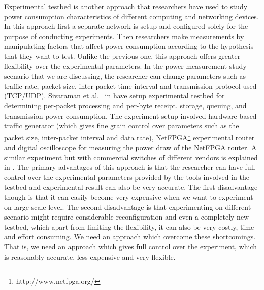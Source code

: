 Experimental testbed is another approach that researchers have used to study power consumption characteristics of different computing and networking devices. In this approach first a separate network is setup and configured solely for the purpose of conducting experiments. Then researchers make measurements by manipulating factors that affect power consumption according to the hypothesis that they want to test. Unlike the previous one, this approach offers greater flexibility over the experimental parameters. In the power measurement study scenario that we are discussing, the researcher can change parameters such as traffic rate, packet size, inter-packet time interval and transmission protocol used (TCP/UDP). Sivaraman et al.{\ } in \cite{Sivaraman} have setup experimental testbed for determining per-packet processing and per-byte receipt, storage, queuing, and transmission power consumption. The experiment setup involved hardware-based traffic generator (which gives fine grain control over parameters such as the packet size, inter-packet interval and data rate), NetFPGA\footnote{http://www.netfpga.org/} experimental router and digital oscilloscope for measuring the power draw of the NetFPGA router. A similar experiment but with commercial switches of different vendors is explained in \cite{DBLP:journals/comcom/SivaramanRZSVMR14}. The primary advantages of this approach is that the researcher can have full control over the experimental parameters provided by the tools involved in the testbed and experimental result can also be very accurate. The first disadvantage though is that it can easily become very expensive when we want to experiment on large-scale level. The second disadvantage is that experimenting on different scenario might require considerable reconfiguration and even a completely new testbed, which apart from limiting the flexibility, it can also be very costly, time and effort consuming. We need an approach which overcome these shortcomings. That is, we need an approach which gives full control over the experiment, which is reasonably accurate, less expensive and very flexible. 

